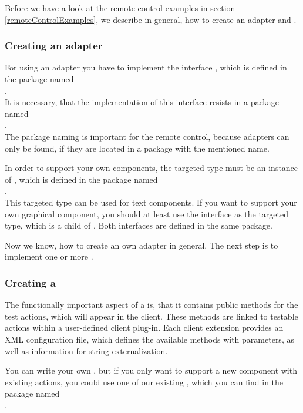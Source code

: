 Before we have a look at the \app{} remote control examples in section
\ref{remoteControlExamples}, we describe in general, how to create an
adapter and \gdtesterclasses.

\subsubsection{Creating an adapter}

For using an adapter you have to implement the interface
, which is defined in the package named\\
.\\
It is necessary, that the implementation of this interface resists in a package
named\\
.\\
The package naming is important for the \app{} remote control, because adapters
can only be found, if they are located in a package with the mentioned name.

In order to support your own components, the targeted type must be an instance
of , which is defined in the package named\\
.\\
This targeted type can be used for text components. If you want to support your
own graphical component, you should at least use the interface
 as the targeted type, which is a child of
. Both interfaces are defined in the same package.

Now we know, how to create an own adapter in general. The next step is to
implement one or more \gdtesterclass.

\subsubsection{Creating a \gdtesterclass}

The functionally important aspect of a \gdtesterclass is, that it
contains public methods for the \app{} test actions, which will appear in
the client. These methods are linked to testable actions within a user-defined
\app{} client plug-in. Each \app{} client extension provides an XML
configuration file, which defines the available methods with parameters, as
well as information for string externalization.

You can write your own \gdtesterclasses, but if you only want to support a new
component with existing actions, you could use one of our existing
\gdtesterclasses, which you can find in the package named\\
.

